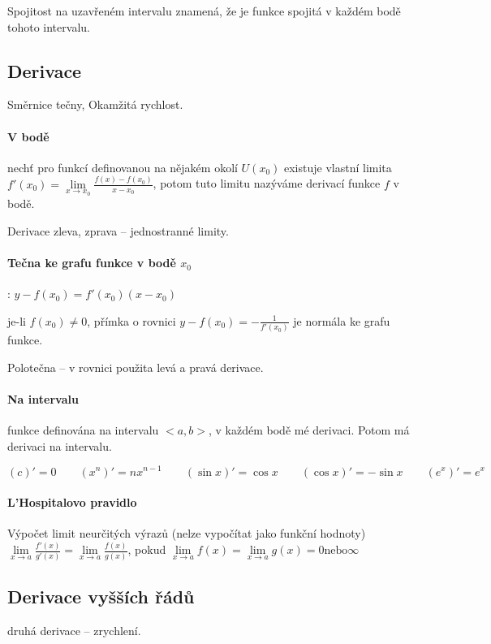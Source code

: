 \documentclass[a4paper, 11pt]{report}
\begin{document}
Spojitost na uzavřeném intervalu znamená, že je funkce spojitá v každém bodě tohoto intervalu.

\subsection{Derivace}
Směrnice tečny, Okamžitá rychlost.

\paragraph{V bodě} nechť pro funkcí definovanou na nějakém okolí $U(x_0)$ existuje vlastní limita $f'(x_0) = \lim\limits_{x \to x_0} \frac{f(x) - f(x_0)}{x - x_0}$, potom tuto limitu nazýváme derivací funkce $f$ v bodě.

Derivace zleva, zprava -- jednostranné limity.

\paragraph{Tečna ke grafu funkce v bodě $x_0$}: $y-f(x_0) = f'(x_0) (x-x_0)$

je-li $f(x_0) \neq 0$, přímka o rovnici $y - f(x_0) = - \frac{1}{f'(x_0)}$ je normála ke grafu funkce.

Polotečna -- v rovnici použita levá a pravá derivace.

\paragraph{Na intervalu}
funkce definována na intervalu $<a, b>$, v každém bodě mé derivaci. Potom má derivaci na intervalu.

$(c)' = 0 \qquad
(x^n)' = nx^{n-1} \qquad
(\sin{x})' = \cos{x} \qquad
(\cos{x})' = - \sin{x} \qquad
(e^x)' = e^x$

\paragraph{L'Hospitalovo pravidlo} Výpočet limit neurčitých výrazů (nelze vypočítat jako funkční hodnoty) $\lim\limits_{x \to a} \frac{f'(x)}{g'(x)} = \lim\limits_{x \to a} \frac{f(x)}{g(x)}$, pokud $\lim\limits_{x \to a} f(x) = \lim\limits_{x \to a} g(x) = 0 \text{nebo} \infty$

\subsection{Derivace vyšších řádů} druhá derivace -- zrychlení.
\end{document}
